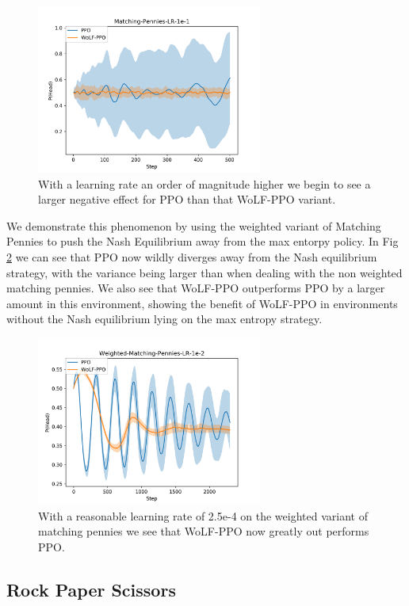 \documentclass[conference]{IEEEtran}
\begin{document}
\begin{figure}
    \centering
    \includegraphics[width=20em]{Figures/matching-pennies-lr-1e-1.png}
    \caption{With a learning rate an order of magnitude higher we begin to see a larger negative effect for PPO than that WoLF-PPO variant.}
    \label{fig:mp-ppo-e1}
\end{figure}

We demonstrate this phenomenon by using the weighted variant of Matching Pennies to push the Nash Equilibrium away from the max entorpy policy. In Fig \ref{fig:weighted-mp-ppo-e2} we can see that PPO now wildly diverges away from the Nash equilibrium strategy, with the variance being larger than when dealing with the non weighted matching pennies. We also see that WoLF-PPO outperforms PPO by a larger amount in this environment, showing the benefit of WoLF-PPO in environments without the Nash equilibrium lying on the max entropy strategy.

\begin{figure}
    \centering
    \includegraphics[width=20em]{Figures/weighted-matching-pennies-lr-1e-2.png}
    \caption{With a reasonable learning rate of 2.5e-4 on the weighted variant of matching pennies we see that WoLF-PPO now greatly out performs PPO.}
    \label{fig:weighted-mp-ppo-e2}
\end{figure}

\subsection{Rock Paper Scissors}
\end{document}
